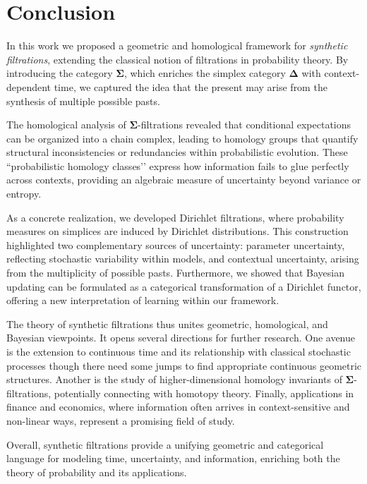 \documentclass[12pt, a4paper]{amsart}
\theoremstyle{plain}
\theoremstyle{definition}
\numberwithin{figure}{section}
\numberwithin{table}{section}
\numberwithin{equation}{section}
\newcommand{\bDelta}{\mathbf{\Delta}}
\newcommand{\bSigma}{\mathbf{\Sigma}}
\begin{document}
\section{Conclusion}
\label{sec:conclusion}

In this work
we proposed a geometric and homological framework for \emph{synthetic filtrations},
extending the classical notion of filtrations in probability theory.
By introducing the category $\bSigma$,
which enriches the simplex category $\bDelta$
with context-dependent time,
we captured the idea that
the present may arise from the synthesis of multiple possible pasts.

The homological analysis of $\bSigma$-filtrations
revealed that conditional expectations can be organized into a chain complex,
leading to homology groups that quantify structural inconsistencies
or redundancies within probabilistic evolution.
These ``probabilistic homology classes’’
express how information fails to glue perfectly across contexts,
providing an algebraic measure of uncertainty beyond variance or entropy.

As a concrete realization,
we developed Dirichlet filtrations,
where probability measures on simplices are induced by Dirichlet distributions.
This construction highlighted two complementary sources of uncertainty:
parameter uncertainty, reflecting stochastic variability within models,
and contextual uncertainty, arising from the multiplicity of possible pasts.
Furthermore,
we showed that Bayesian updating can be formulated
as a categorical 
transformation of a Dirichlet functor,
offering a new interpretation of learning within our framework.

The theory of synthetic filtrations 
thus unites geometric, homological, and Bayesian viewpoints.
It opens several directions for further research. 
One avenue is the extension to continuous time 
and its relationship with classical stochastic processes
though there need some jumps to find appropriate continuous geometric structures. 
Another is 
the study of higher-dimensional homology invariants of $\bSigma$-filtrations,
potentially connecting with homotopy theory. 
Finally, applications in finance and economics, 
where information often arrives in context-sensitive and non-linear ways, 
represent a promising field of study.

Overall, 
synthetic filtrations provide a unifying geometric and categorical language 
for modeling time, uncertainty, and information, 
enriching both the theory of probability and its applications.
\end{document}
